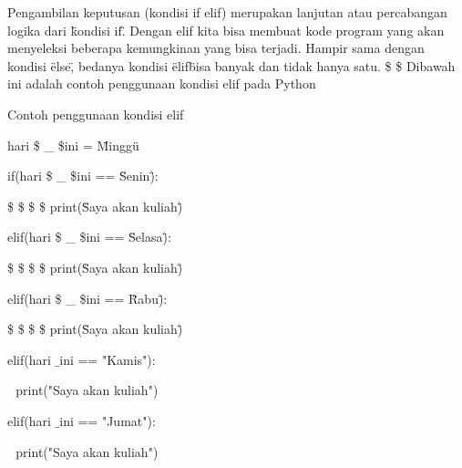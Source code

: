 \vspace{12pt}
\noindent 
Pengambilan keputusan (kondisi if elif) merupakan lanjutan atau percabangan logika dari \"kondisi if\". Dengan elif kita bisa membuat kode program yang akan menyeleksi beberapa kemungkinan yang bisa terjadi. Hampir sama dengan kondisi \"else\", bedanya kondisi \"elif\" bisa banyak dan tidak hanya satu. \$  \$\vspace{\baselineskip}
\vspace{\baselineskip}
Dibawah ini adalah contoh penggunaan kondisi elif pada Python \par
\vspace{12pt}
\noindent 
Contoh penggunaan kondisi elif \par
\vspace{12pt}
\noindent 
hari \$  \_  \$ini = \"Minggu\" \par
\noindent 
\vspace{\baselineskip}
\vspace{\baselineskip}
if(hari \$  \_  \$ini == \"Senin\"): \par
\noindent 
\vspace{\baselineskip}
 \$  \$  \$  \$ print(\"Saya akan kuliah\") \par
\noindent 
\vspace{\baselineskip}
elif(hari \$  \_  \$ini == \"Selasa\"): \par
\noindent 
\vspace{\baselineskip}
 \$  \$  \$  \$ print(\"Saya akan kuliah\") \par
\noindent 
\vspace{\baselineskip}
elif(hari \$  \_  \$ini == \"Rabu\"): \par
\noindent 
\vspace{\baselineskip}
 \$  \$  \$  \$ print(\"Saya akan kuliah\") \par
\noindent 
\vspace{\baselineskip}
elif(hari $  \_  $ini == "Kamis"): \par
\noindent 
\vspace{\baselineskip}
 $  $  $  $ print("Saya akan kuliah") \par
\noindent 
\vspace{\baselineskip}
elif(hari $  \_  $ini == "Jumat"): \par
\noindent 
\vspace{\baselineskip}
 $  $  $  $ print("Saya akan kuliah") \par
\noindent 
\vspace{\baselineskip}
